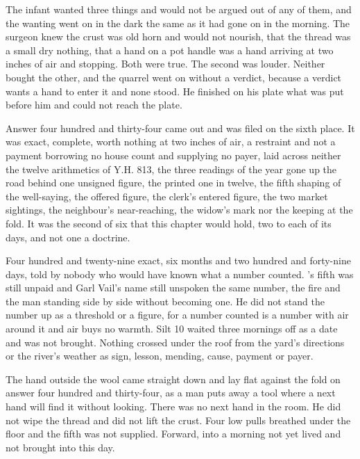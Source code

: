 The infant wanted three things and would not be argued out of any of them, and the wanting went on in the dark the same as it had gone on in the morning. The surgeon knew the crust was old horn and would not nourish, that the thread was a small dry nothing, that a hand on a pot handle was a hand arriving at two inches of air and stopping. Both were true. The second was louder. Neither bought the other, and the quarrel went on without a verdict, because a verdict wants a hand to enter it and none stood. He finished on his plate what was put before him and could not reach the plate.

Answer four hundred and thirty-four came out and was filed on the sixth place. It was exact, complete, worth nothing at two inches of air, a restraint and not a payment borrowing no house count and supplying no payer, laid across neither the twelve arithmetics of Y.H. 813, the three readings of the year gone up the road behind one unsigned figure, the printed one in twelve, the fifth shaping of the well-saying, the offered figure, the clerk's entered figure, the two market sightings, the neighbour's near-reaching, the widow's mark nor the keeping at the fold. It was the second of six that this chapter would hold, two to each of its days, and not one a doctrine.

Four hundred and twenty-nine exact, six months and two hundred and forty-nine days, told by nobody who would have known what a number counted. 's fifth was still unpaid and Garl Vail's name still unspoken the same number, the fire and the man standing side by side without becoming one. He did not stand the number up as a threshold or a figure, for a number counted is a number with air around it and air buys no warmth. Silt 10 waited three mornings off as a date and was not brought. Nothing crossed under the roof from the yard's directions or the river's weather as sign, lesson, mending, cause, payment or payer.

The hand outside the wool came straight down and lay flat against the fold on answer four hundred and thirty-four, as a man puts away a tool where a next hand will find it without looking. There was no next hand in the room. He did not wipe the thread and did not lift the crust. Four low pulls breathed under the floor and the fifth was not supplied. Forward, into a morning not yet lived and not brought into this day.
